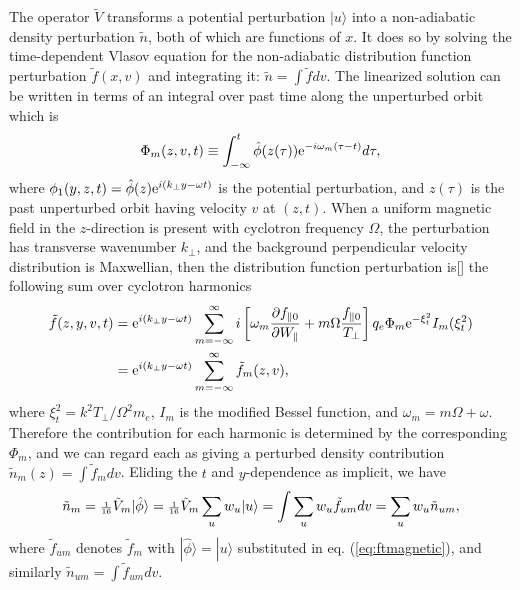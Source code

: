 \documentclass[12pt]{article}
\def\ket#1{|#1\rangle}
\begin{document}
The operator $\tilde{V}$ transforms a potential perturbation $\ket{u}$ into
a non-adiabatic density perturbation $\tilde n$, both of which are
functions of $x$. It does so by solving the time-dependent Vlasov
equation for the non-adiabatic distribution function perturbation
$\tilde f(x,v)$ and integrating it: $\tilde n =\int \tilde f dv$. The
linearized solution can be written in terms of an integral over past
time along the unperturbed orbit which is
\begin{equation}
  \label{eq:phim}
  \Phi_m(z,v,t)\equiv 
  \int_{-\infty}^t \hat\phi(z(\tau)){\rm e}^{-i\omega_m(\tau-t)}d\tau,
\end{equation}
where $\phi_1(y,z,t)=\hat\phi(z){\rm e}^{i(k_\perp y-\omega t)}$ is the potential
perturbation, and $z(\tau)$ is the past unperturbed orbit having
velocity $v$ at $(z,t)$. When a uniform magnetic field in the
$z$-direction is present with cyclotron frequency $\Omega$, the
perturbation has transverse wavenumber $k_\perp$, and the background
perpendicular velocity distribution is Maxwellian, then the
distribution function perturbation is[] the following sum over cyclotron
harmonics
\begin{equation}\label{eq:ftmagnetic}
  \begin{split}
    \tilde f(z,y,v,t) &=  {\rm e}^{i(k_\perp y-\omega t)}
 \sum_{m=-\infty}^\infty i\left[\omega_m
  {\partial f_{\parallel0}\over \partial W_\parallel}
  +m\Omega {f_{\parallel0}\over T_\perp}\right]
  q_e\Phi_m {\rm e}^{-\xi_t^2}I_m(\xi_t^2)\\
  &= {\rm e}^{i(k_\perp y-\omega t)} \sum_{m=-\infty}^\infty \tilde f_m(z,v),
  \end{split}
\end{equation}
where $\xi_t^2=k^2T_\perp/\Omega^2m_e$, $I_m$ is the modified Bessel
function, and $\omega_m=m\Omega+\omega$. Therefore the contribution
for each harmonic is determined by the corresponding $\Phi_m$, and we
can regard each as giving a perturbed density contribution
$\tilde n_m(z)=\int \tilde f_m dv$. Eliding the $t$ and $y$-dependence
as implicit, we have
\begin{equation}
  \label{eq:13}
\tilde  n_m={\scriptstyle {1\over16}}\tilde{V}_{m}\ket{\hat\phi}={\scriptstyle{1\over16}}\tilde{V}_{m}\sum_u w_u\ket{u}=\int \sum_u w_u
  \tilde f_{um} dv=\sum_u w_u \tilde n_{um},
\end{equation}
where $\tilde f_{um}$ denotes $\tilde f_m$ with
$\ket{\hat\phi}=\ket{u}$ substituted in eq. (\ref{eq:ftmagnetic}), and
similarly $\tilde n_{um}=\int \tilde f_{um}dv$.
\end{document}
